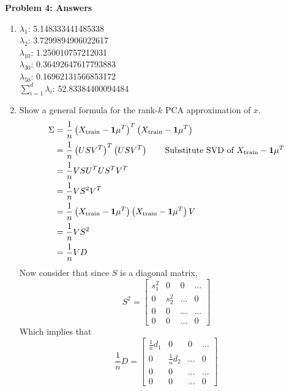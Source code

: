 {\bf Problem 4: Answers}

\begin{enumerate}
    \item
	    $\lambda_1$: 5.148333441485338 \\
	    $\lambda_2$: 3.7299894906022617 \\
	    $\lambda_{10}$: 1.250010757212031 \\
	    $\lambda_{30}$: 0.36492647617793883 \\
	    $\lambda_{50}$: 0.16962131566853172 \\
	    $\sum_{i=1}^d \lambda_i$: 52.83384400094484
    \item Show a general formula for the rank-$k$ PCA approximation of $x$.
	\begin{align*}
	    \Sigma &= \frac{1}{n} \left( X_{\textrm{train}} - \mathbf{1} \mu^T \right)^T \left( X_{\textrm{train}} - \mathbf{1} \mu^T \right) \\
		&= \frac{1}{n} \left( U S V^T \right)^T \left( U S V^T \right) \tag*{Substitute SVD of $X_{\textrm{train}} - \mathbf{1} \mu^T$} \\
		&= \frac{1}{n} V S U^T U S^T V^T \\
		&= \frac{1}{n} V S^2 V^T \\
		&= \frac{1}{n} \left( X_{\textrm{train}} - \mathbf{1} \mu^T \right) \left( X_{\textrm{train}} - \mathbf{1} \mu^T \right) V \\
		&= \frac{1}{n} V S^2 \\
		&= \frac{1}{n} V D
	\end{align*}
	Now consider that since $S$ is a diagonal matrix,
	    \begin{equation*}
		S^2 = 
		    \begin{bmatrix}
			s_1^2 & 0 & 0 & ... \\
			0 & s_2^2 & ... & 0 \\
			0 & 0 & ... & ... \\
			0 & 0 & ... & 0
		    \end{bmatrix}	
	    \end{equation*}
	Which implies that 
	    \begin{equation*}
		\frac{1}{n} D = 
		    \begin{bmatrix}
			\frac{1}{n} d_1 & 0 & 0 & ... \\
			0 & \frac{1}{n} d_2 & ... & 0 \\
			0 & 0 & ... & ... \\
			0 & 0 & ... & 0
		    \end{bmatrix}	
	    \end{equation*}

\end{enumerate}
